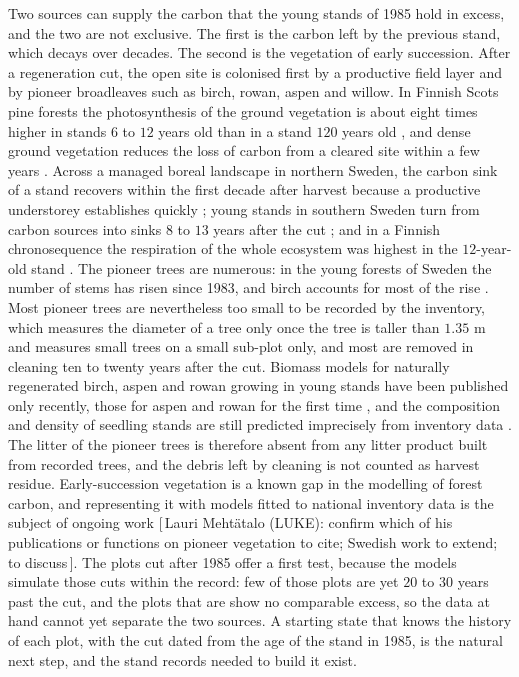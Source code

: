 \documentclass[11pt]{article}
\newcommand{\gap}[1]{\textcolor{red!70!black}{\small[\,#1\,]}}
\begin{document}
Two sources can supply the carbon that the young stands of 1985 hold in excess, and
the two are not exclusive. The first is the carbon left by the previous stand, which
decays over decades. The second is the vegetation of early succession. After a
regeneration cut, the open site is colonised first by a productive field layer and by
pioneer broadleaves such as birch, rowan, aspen and willow. In Finnish Scots pine
forests the photosynthesis of the ground vegetation is about eight times higher in
stands $6$ to $12$ years old than in a stand $120$ years old \citep{Kulmala2011}, and
dense ground vegetation reduces the loss of carbon from a cleared site within a few
years \citep{Zehetgruber2017}. Across a managed boreal landscape in northern Sweden,
the carbon sink of a stand recovers within the first decade after harvest because a
productive understorey establishes quickly \citep{Peichl2022}; young stands in
southern Sweden turn from carbon sources into sinks $8$ to $13$ years after the cut
\citep{Grelle2023}; and in a Finnish chronosequence the respiration of the whole
ecosystem was highest in the $12$-year-old stand \citep{Kolari2004}. The pioneer trees
are numerous: in the young forests of Sweden the number of stems has risen since 1983,
and birch accounts for most of the rise \citep{DahlgrenLidman2024}. Most pioneer trees
are nevertheless too small to be recorded by the inventory, which measures the diameter
of a tree only once the tree is taller than $1.35$ m and measures small trees on a
small sub-plot only, and most are removed in cleaning ten to twenty years after the
cut. Biomass models for naturally regenerated birch, aspen and rowan growing in young
stands have been published only recently, those for aspen and rowan for the first time
\citep{Repola2024}, and the composition and density of seedling stands are still
predicted imprecisely from inventory data \citep{Rana2023}. The litter of the pioneer
trees is therefore absent from any litter product built from recorded trees, and the
debris left by cleaning is not counted as harvest residue. Early-succession vegetation
is a known gap in the modelling of forest carbon, and representing it with models
fitted to national inventory data is the subject of ongoing work
\citep[e.g.][]{Mehtatalo2025}\gap{Lauri Mehtätalo (LUKE): confirm which of his
publications or functions on pioneer vegetation to cite; Swedish work to extend; to
discuss}. The plots cut after 1985 offer a first test,
because the models simulate those cuts within the record: few of those plots are yet
$20$ to $30$ years past the cut, and the plots that are show no comparable excess, so
the data at hand cannot yet separate the two sources. A starting state that knows the
history of each plot, with the cut dated from the age of the stand in 1985, is the
natural next step, and the stand records needed to build it exist.
\end{document}
